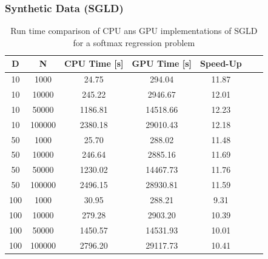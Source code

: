 \documentclass[10pt,a4paper]{beamer}
\begin{document}
\begin{frame}\frametitle{Synthetic Data (SGLD)}
\begin{table}[h]
	\centering
	\begin{tabular}{|c|c|c|c|c|c|c|}
		\hline 
		D & N & CPU Time [s] & GPU Time [s]  & Speed-Up\\ 
		\hline 		
		10	& 1000& 	24.75& 294.04  & 11.87\\
		10	& 10000& 	245.22& 2946.67	& 12.01\\
		10	& 50000& 	1186.81& 14518.66 & 12.23\\
		10	& 100000	& 2380.18& 29010.43& 12.18\\
		\hline
		50	& 1000	& 25.70& 288.02	& 11.48\\
		50	& 10000	& 246.64& 2885.16& 11.69\\
		50	& 50000	& 1230.02& 14467.73	& 11.76\\
		50 & 	100000	& 2496.15& 28930.81	& 11.59\\
		\hline
		100	& 1000	& 30.95& 288.21& 9.31\\
		100	& 10000	& 279.28& 2903.20& 10.39\\
		100	& 50000	& 1450.57& 14531.93& 10.01\\
		100	& 100000& 	2796.20& 29117.73& 10.41\\
		
		\hline 
	\end{tabular}
	\caption{Run time comparison of CPU ans GPU implementations of SGLD for a softmax regression problem}
	\label{tab:sgld} 
\end{table}
\end{frame}
\end{document}
